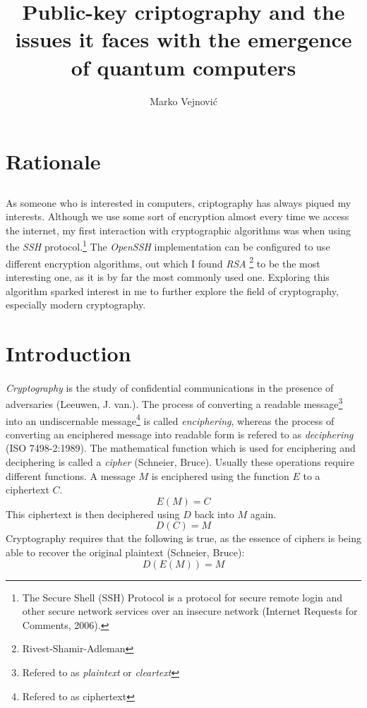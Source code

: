 \documentclass[a4paper, 10pt]{article}
\begin{document}
\title{Public-key criptography and the issues it faces with the emergence of quantum computers}
\author{Marko Vejnovi\'{c}}
\maketitle

\section{Rationale}
\subsection*{}
\paragraph*{}
As someone who is interested in computers, criptography has always piqued my interests. Although we use some sort of 
encryption almost every time we access the internet, my first interaction with cryptographic algorithms was when using 
the \textit{SSH} protocol.\footnote{The Secure Shell (SSH) Protocol is a protocol for secure remote login and other
secure network services over an insecure network (Internet Requests for Comments, 2006).} The \textit{OpenSSH}
implementation can be configured to use different encryption algorithms, out which I found \textit{RSA}
\footnote{Rivest-Shamir-Adleman} to be the most interesting one, as it is by far the most commonly used one. Exploring
this algorithm sparked interest in me to further explore the field of cryptography, especially modern cryptography.

\section{Introduction}
\paragraph*{}
\textit{Cryptography} is the study of confidential communications in the presence of adversaries (Leeuwen, J. van.). 
The process of converting a readable message\footnote{Refered to as \textit{plaintext} or \textit{cleartext}} into an 
undiscernable message\footnote{Refered to as ciphertext} is called \textit{enciphering}, whereas the process of 
converting an enciphered message into readable form is refered to as \textit{deciphering} (ISO 7498-2:1989). The 
mathematical function which is used for enciphering and deciphering is called a \textit{cipher} (Schneier, Bruce). 
Usually these operations require different functions. A message $M$ is enciphered using the function $E$ to a 
ciphertext $C$.
$$E(M) = C$$
This ciphertext is then deciphered using $D$ back into $M$ again.
$$D(C) = M$$
Cryptography requires that the following is true, as the essence of ciphers is being able to recover the original
plaintext (Schneier, Bruce):
$$D(E(M)) = M$$
\end{document}

